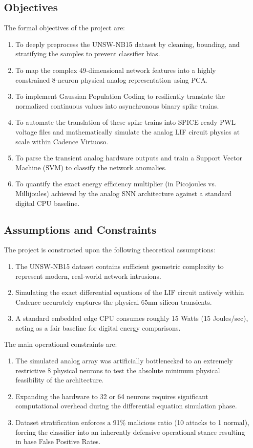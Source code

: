 \documentclass{ieeeaccess}
\begin{document}
\subsection{Objectives}
The formal objectives of the project are:
\begin{enumerate}
\item To deeply preprocess the UNSW-NB15 dataset by cleaning, bounding, and stratifying the samples to prevent classifier bias.
\item To map the complex 49-dimensional network features into a highly constrained 8-neuron physical analog representation using PCA.
\item To implement Gaussian Population Coding to resiliently translate the normalized continuous values into asynchronous binary spike trains.
\item To automate the translation of these spike trains into SPICE-ready PWL voltage files and mathematically simulate the analog LIF circuit physics at scale within Cadence Virtuoso.
\item To parse the transient analog hardware outputs and train a Support Vector Machine (SVM) to classify the network anomalies.
\item To quantify the exact energy efficiency multiplier (in Picojoules vs. Millijoules) achieved by the analog SNN architecture against a standard digital CPU baseline.
\end{enumerate}

\subsection{Assumptions and Constraints}
The project is constructed upon the following theoretical assumptions:
\begin{enumerate}
\item The UNSW-NB15 dataset contains sufficient geometric complexity to represent modern, real-world network intrusions.
\item Simulating the exact differential equations of the LIF circuit natively within Cadence accurately captures the physical 65nm silicon transients.
\item A standard embedded edge CPU consumes roughly 15 Watts (15 Joules/sec), acting as a fair baseline for digital energy comparisons.
\end{enumerate}

The main operational constraints are:
\begin{enumerate}
\item The simulated analog array was artificially bottlenecked to an extremely restrictive 8 physical neurons to test the absolute minimum physical feasibility of the architecture.
\item Expanding the hardware to 32 or 64 neurons requires significant computational overhead during the differential equation simulation phase.
\item Dataset stratification enforces a 91\% malicious ratio (10 attacks to 1 normal), forcing the classifier into an inherently defensive operational stance resulting in base False Positive Rates.
\end{enumerate}
\end{document}
